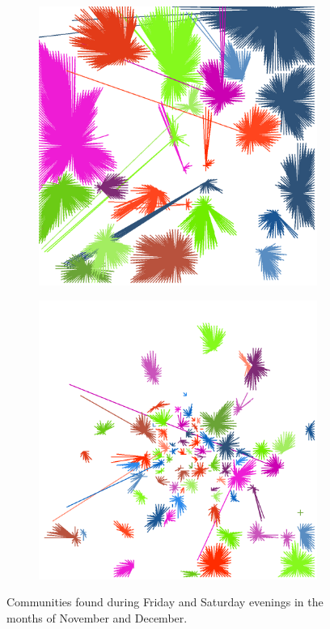 \documentclass[12pt,a4paper]{article}
\begin{document}
\begin{figure}[H]
\begin{subfigure}[b]{0.3\textwidth}
\includegraphics[width=\textwidth]{weekDef/edges-6Sat-mid.png}
\end{subfigure}
\begin{subfigure}[b]{0.3\textwidth}
\includegraphics[width=\textwidth]{weekDef/edges-6Sat-small.png}
\end{subfigure}
\caption{Communities found during Friday and Saturday evenings in the months of November and December.}
\label{fig:wednesdayworking}
\end{figure}
\end{document}
